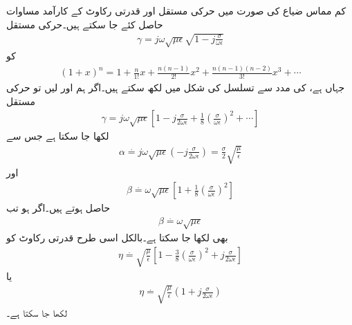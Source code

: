 کم مماس ضیاع کی صورت میں حرکی مستقل اور قدرتی رکاوٹ کے کارآمد مساوات حاصل کئے جا سکتے ہیں۔حرکی مستقل
\begin{align*}
\gamma = j \omega \sqrt{\mu \epsilon}\sqrt{1-j \frac{\sigma}{\omega \epsilon}}
\end{align*}
کو 
\begin{align*}
(1+x)^n=1+\frac{n}{1!}x+\frac{n(n-1)}{2!}x^2+\frac{n(n-1)(n-2)}{3!}x^3+\cdots
\end{align*}
جہاں  ہے، کی مدد سے  تسلسل کی شکل میں لکھ سکتے ہیں۔اگر ہم  اور  لیں تو حرکی مستقل 
\begin{align*}
\gamma=j \omega \sqrt{\mu \epsilon} \left[1-j\frac{\sigma}{2\omega \epsilon}+\frac{1}{8}\left(\frac{\sigma}{\omega \epsilon}\right)^2+\cdots \right]
\end{align*}
 لکھا جا سکتا ہے جس سے
\begin{align}\label{مساوات_موج_تضعیفی_سادہ}
\alpha \overset{.}{=} j \omega \sqrt{\mu \epsilon} \left(-j\frac{\sigma}{2\omega \epsilon} \right)=\frac{\sigma}{2}\sqrt{\frac{\mu}{\epsilon}}
\end{align}
اور 
\begin{align}\label{مساوات_موج_زاویائی_سادہ_الف}
\beta \overset{.}{=}\omega \sqrt{\mu \epsilon}\left[1+\frac{1}{8}\left(\frac{\sigma}{\omega \epsilon}\right)^2 \right]
\end{align}
حاصل ہوتے ہیں۔اگر  ہو تب
\begin{align}\label{مساوات_موج_زاویائی_سادہ_ب}
\beta \overset{.}{=}\omega \sqrt{\mu \epsilon}
\end{align}
بھی لکھا جا سکتا ہے۔بالکل اسی طرح قدرتی رکاوٹ کو
\begin{align}\label{مساوات_موج_رکاوٹ_سادہ_الف}
\eta \overset{.}{=} \sqrt{\frac{\mu}{\epsilon}} \left[1-\frac{3}{8}\left(\frac{\sigma}{\omega \epsilon}\right)^2 +j \frac{\sigma}{2\omega \epsilon}\right]
\end{align}
یا
\begin{align}\label{مساوات_موج_رکاوٹ_سادہ_ب}
\eta \overset{.}{=} \sqrt{\frac{\mu}{\epsilon}} \left(1 +j \frac{\sigma}{2\omega \epsilon}\right)
\end{align}
لکھا جا سکتا ہے۔


